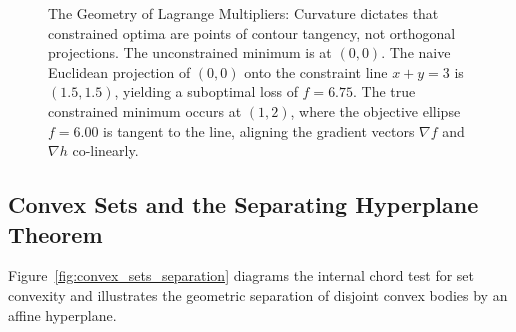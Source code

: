\begin{figure}[htbp]
\caption{The Geometry of Lagrange Multipliers: Curvature dictates that constrained optima are points of contour tangency, not orthogonal projections. The unconstrained minimum is at $(0, 0)$. The naive Euclidean projection of $(0, 0)$ onto the constraint line $x + y = 3$ is $(1.5, 1.5)$, yielding a suboptimal loss of $f = 6.75$. The true constrained minimum occurs at $(1, 2)$, where the objective ellipse $f = 6.00$ is tangent to the line, aligning the gradient vectors $\nabla f$ and $\nabla h$ co-linearly.}
\label{fig:constrained_geometry}
\end{figure}

\subsection{Convex Sets and the Separating Hyperplane Theorem}
Figure~\ref{fig:convex_sets_separation} diagrams the internal chord test for set convexity and illustrates the geometric separation of disjoint convex bodies by an affine hyperplane.

